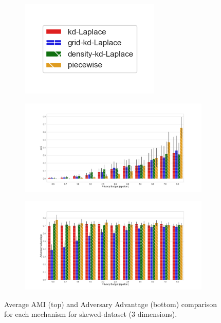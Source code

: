\newpage

\begin{figure}[H]
  \centering
  \begin{subfigure}{0.30\textwidth}
    \includegraphics[width=\textwidth]{Results/kd-laplace/ami_bar_comparison_legend.png}
  \end{subfigure}
  \begin{subfigure}{1\textwidth}
    \includegraphics[width=1\textwidth]{Results/kd-laplace/ami_skewed-dataset_comparison.png}
  \end{subfigure}
  \begin{subfigure}{1\textwidth}
    \includegraphics[width=1\textwidth]{Results/kd-laplace/shokri_mi_adv_skewed-dataset_comparison.png}
  \end{subfigure}
  \caption{Average AMI (top) and Adversary Advantage (bottom) comparison for each mechanism for skewed-dataset (3 dimensions).}
  \label{fig:utility_skewed-dataset_comparison_nd_plot}
\end{figure}
\newpage



